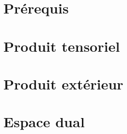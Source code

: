 \documentclass[../geometrie.tex]{subfiles}
\begin{document}
	\localtableofcontents

	\section{Prérequis}{
		
	}

	\section{Produit tensoriel}{
		
	}

	\section{Produit extérieur}{
		
	}

	\section{Espace dual}{
		
	}
\end{document}
